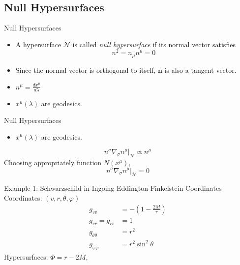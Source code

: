 \documentclass{beamer}
\begin{document}
\begin{darkframes}
    \subsection{Null Hypersurfaces}
    	\begin{frame}{Null Hypersurfaces}
    		\begin{itemize}
    		\item A hypersurface $\mathcal{N}$ is called \emph{null hypersurface} if its normal vector satisfies
			$$ n^{2}=n_{\mu}n^{\mu}=0$$
            \pause
            \item Since the normal vector is orthogonal to itself, $\mathbf{n}$ is also a tangent vector. 
			\pause
            \item $n^{\mu}=\frac{dx^{\mu}}{d\lambda}$
            \pause
            \item $x^{\mu}\left(\lambda\right)$ are geodesics.
    		\end{itemize}
    	\end{frame}
        
        \begin{frame}{Null Hypersurfaces}
    		\begin{itemize}
            \item $x^{\mu}\left(\lambda\right)$ are geodesics.
    		\end{itemize}
            \pause
            $$\left.n^{\sigma}\nabla_{\sigma}n^{\mu}\right|_{\mathcal{N}}\propto n^{\mu}$$
            \pause
            Choosing appropriately function $N\left(x^{\mu}\right)$,
            \pause
            $$\left.n^{\sigma}\nabla_{\sigma}n^{\mu}\right|_{\mathcal{N}} = 0$$
    	\end{frame}
       
  	\end{darkframes}
        \begin{frame}{Example 1: Schwarzschild in Ingoing Eddington-Finkelstein Coordinates}
           	Coordinates: $\left(v,r,\theta,\varphi\right)$ 
            \pause
            \begin{align*}
                g_{vv} &= -\left(1-\frac{2M}{r}\right)\\
                g_{vr}=g_{rv} &= 1\\
                g_{\theta\theta} &=  r^{2}\\
                g_{\varphi\varphi} &= r^{2}\sin^{2}\theta
            \end{align*}
            \pause
            Hypersurfaces: $\Phi=r-2M$,
        \end{frame}
        
\end{document}
